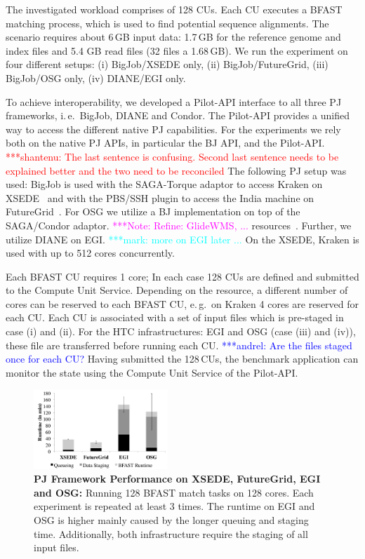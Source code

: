 \documentclass[conference,final]{IEEEtran}
\newcommand{\jhanote}[1]{ {\textcolor{red} { ***shantenu: #1 }}}
\newcommand{\alnote}[1]{ {\textcolor{blue} { ***andrel: #1 }}}
\newcommand{\msnote}[1]{ {\textcolor{cyan} { ***mark: #1 }}}
\newcommand{\note}[1]{ {\textcolor{magenta} { ***Note: #1 }}}
\newcommand{\alnote}[1]{}
\newcommand{\jhanote}[1]{}
\newcommand{\msnote}[1]{}
\newcommand{\note}[1]{}
\newcommand{\cu}{CU\xspace}
\newcommand{\cus}{CUs\xspace}
\newcommand{\up}{\vspace*{-1em}}
\begin{document}
The investigated workload comprises of 128 \cus. Each \cu executes a BFAST
matching process, which is used to find potential sequence alignments. The
scenario requires about 6\,GB input data: 1.7\,GB for the reference genome and
index files and 5.4 GB read files (32 files a 1.68\,GB). We run the experiment
on four different setups: (i) BigJob/XSEDE only, (ii) BigJob/FutureGrid, (iii)
BigJob/OSG only, (iv) DIANE/EGI only. 


To achieve interoperability, we developed a Pilot-API interface to all three PJ
frameworks, i.\,e.\ BigJob, DIANE and Condor. The Pilot-API provides a unified
way to access the different native PJ capabilities. For the experiments we rely
both on the native PJ APIs, in particular the BJ API, and the 
Pilot-API.\jhanote{The
  last sentence is confusing. Second last sentence needs to be
  explained better and the two need to be reconciled}
The following PJ setup was used: BigJob is used with the SAGA-Torque adaptor to
access Kraken on XSEDE~\cite{xsede} and with the PBS/SSH plugin to access the
India machine on FutureGrid~\cite{fg}. For OSG we utilize a BJ implementation on
top of the SAGA/Condor adaptor.\note{Refine: GlideWMS, ...}
resources~\cite{1742-6596-78-1-012057}. Further, we utilize DIANE on EGI.
\msnote{more on EGI later ...} On the XSEDE, Kraken is used with up to 512 cores
concurrently.


Each BFAST \cu requires 1 core; In each case 128 \cus are defined and submitted
to the Compute Unit Service. Depending on the resource, a different number of
cores can be reserved to each BFAST \cu, e.\,g.\ on Kraken 4 cores are reserved
for each \cu. Each \cu is associated with a set of input files which is
pre-staged in case (i) and (ii). For the HTC infrastructures: EGI and OSG (case
(iii) and (iv)), these file are transferred before running each \cu. \alnote{Are
the files staged once for each \cu?} Having submitted the 128\,\cus, the
benchmark application can monitor the state using the Compute Unit Service of
the Pilot-API.

\begin{figure}[t]
	\centering
\includegraphics[width=0.45\textwidth]{perf/interop/128-bfast-egi-fg-xsede-osg.pdf}
\caption{\textbf{PJ Framework Performance on XSEDE, FutureGrid, EGI and 
OSG:} Running 128 BFAST match tasks on 128 cores. Each experiment is
          repeated at least 3 times. The runtime on EGI and OSG is higher
          mainly caused by the longer queuing and staging time. Additionally, 
		  both 
		  infrastructure require the staging of all input files. 
		\up\up}

	\label{fig:perf_perf-bfast-bj}
\end{figure}
\end{document}
